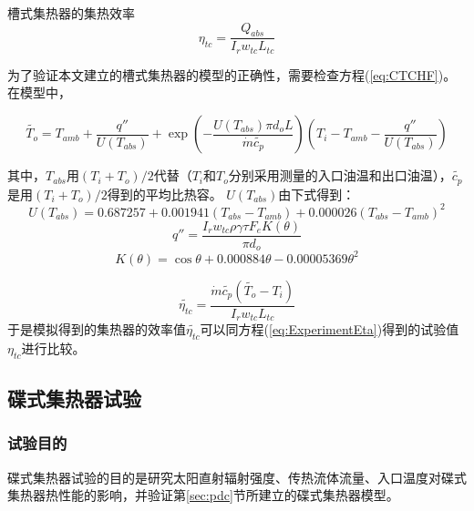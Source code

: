 槽式集热器的集热效率
\begin{equation}
	\eta_{tc} = \dfrac{Q_{abs}}{I_rw_{tc}L_{tc}}
	\label{eq:ExperimentEta}
\end{equation}

为了验证本文建立的槽式集热器的模型的正确性，需要检查方程(\ref{eq:CTCHF})。在模型中，

\begin{equation}
	\widetilde{T_{o}}=T_{amb} + \dfrac{q''}{U(T_{abs})} + \exp(-\frac{U(T_{abs})\pi d_o L}{\dot{m}\widetilde{c_p}})(T_{i}-T_{amb}-\dfrac{q''}{U(T_{abs})})
	\label{eq:CheckT_o}
\end{equation}

其中，$T_{abs}$用$(T_i + T_o)/2$代替（$T_i$和$T_o$分别采用测量的入口油温和出口油温），$\widetilde{c_p}$是用$(T_i + T_o)/2$得到的平均比热容。
$U(T_{abs})$由下式得到\cite{Romero2007}：
\begin{equation}
	U(T_{abs}) = 0.687257 + 0.001941(T_{abs} - T_{amb}) + 0.000026(T_{abs} - T_{amb})^2
	\label{eq:U_T_abs}
\end{equation}
\begin{equation}
	q'' = \frac{I_r w_{tc} \rho \gamma \tau F_e K(\theta)}{\pi d_o}
\end{equation}
\begin{equation}
	K(\theta) = \cos\theta+0.000884\theta-0.00005369\theta^2
\end{equation}

\begin{equation}
	\widetilde{\eta_{tc}} = \dfrac{\dot{m}\widetilde{c_p}(\widetilde{T_o}-T_i)}{I_rw_{tc}L_{tc}}
\end{equation}
于是模拟得到的集热器的效率值$\widetilde{\eta_{tc}}$可以同方程(\ref{eq:ExperimentEta})得到的试验值$\eta_{tc}$进行比较。

	
\subsection{碟式集热器试验}
\subsubsection{试验目的}
碟式集热器试验的目的是研究太阳直射辐射强度、传热流体流量、入口温度对碟式集热器热性能的影响，并验证第\ref{sec:pdc}节所建立的碟式集热器模型。

